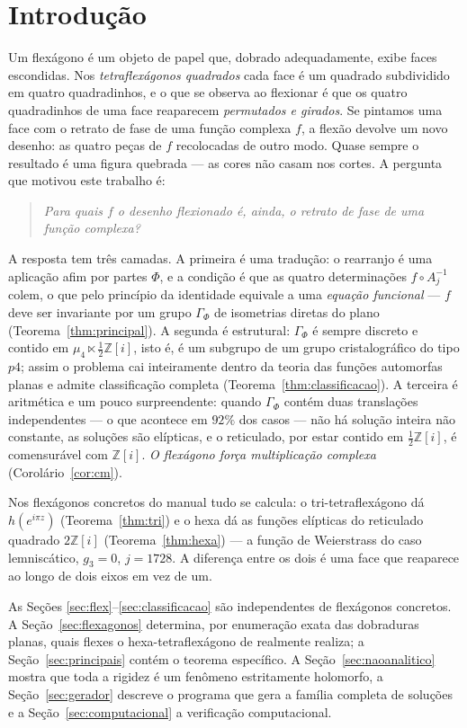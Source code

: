 \documentclass[11pt,a4paper]{article}
\theoremstyle{plain}
\theoremstyle{definition}
\theoremstyle{remark}
\newcommand{\Z}{\mathbb{Z}}
\newcommand{\Zi}{\Z[i]}
\begin{document}
\section{Introdução}

Um flexágono é um objeto de papel que, dobrado adequadamente, exibe faces
escondidas. Nos \emph{tetraflexágonos quadrados} cada face é um quadrado
subdividido em quatro quadradinhos, e o que se observa ao flexionar é que os
quatro quadradinhos de uma face reaparecem \emph{permutados e girados}. Se
pintamos uma face com o retrato de fase de uma função complexa $f$, a flexão
devolve um novo desenho: as quatro peças de $f$ recolocadas de outro modo.
Quase sempre o resultado é uma figura quebrada --- as cores não casam nos cortes.
A pergunta que motivou este trabalho é:

\begin{quote}
\emph{Para quais $f$ o desenho flexionado é, ainda, o retrato de fase de uma
função complexa?}
\end{quote}

A resposta tem três camadas. A primeira é uma tradução: o rearranjo é uma
aplicação afim por partes $\Phi$, e a condição é que as quatro determinações
$f\circ A_j^{-1}$ colem, o que pelo princípio da identidade equivale a uma
\emph{equação funcional} --- $f$ deve ser invariante por um grupo $\Gamma_\Phi$
de isometrias diretas do plano (Teorema~\ref{thm:principal}). A segunda é
estrutural: $\Gamma_\Phi$ é sempre discreto e contido em
$\mu_4\ltimes\frac12\Zi$, isto é, é um subgrupo de um grupo cristalográfico do
tipo $p4$; assim o problema cai inteiramente dentro da teoria das funções
automorfas planas e admite classificação completa
(Teorema~\ref{thm:classificacao}). A terceira é aritmética e um pouco
surpreendente: quando $\Gamma_\Phi$ contém duas translações independentes ---
o que acontece em $92\%$ dos casos --- não há solução inteira não constante, as
soluções são elípticas, e o reticulado, por estar contido em $\frac12\Zi$, é
comensurável com $\Zi$. \emph{O flexágono força multiplicação complexa}
(Corolário~\ref{cor:cm}).

Nos flexágonos concretos do manual \cite{manual} tudo se calcula: o
tri-tetraflexágono dá $h(e^{i\pi z})$ (Teorema~\ref{thm:tri}) e o hexa dá as
funções elípticas do reticulado quadrado $2\Zi$ (Teorema~\ref{thm:hexa}) --- a
função de Weierstrass do caso lemniscático, $g_3=0$, $j=1728$. A diferença
entre os dois é uma face que reaparece ao longo de dois eixos em vez de um.

\medskip
As Seções \ref{sec:flex}--\ref{sec:classificacao} são independentes de
flexágonos concretos. A Seção~\ref{sec:flexagonos} determina, por enumeração
exata das dobraduras planas, quais flexes o hexa-tetraflexágono de \cite{manual}
realmente realiza; a Seção~\ref{sec:principais} contém o teorema específico. A
Seção~\ref{sec:naoanalitico} mostra que toda a rigidez é um fenômeno
estritamente holomorfo, a Seção~\ref{sec:gerador} descreve o programa que gera a
família completa de soluções e a Seção~\ref{sec:computacional} a verificação
computacional.
\end{document}
